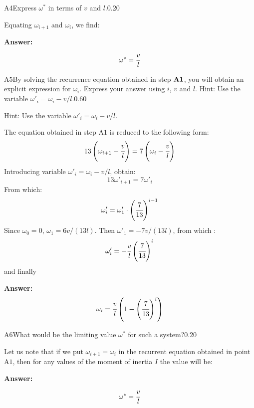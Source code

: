 \documentclass[11pt,a4paper]{article}
\begin{document}
\begin{solcard}{A4}{Express $\omega^*$ in terms of $v$ and $l$.}{0.20}

Equating $\omega_{i+1}$ and $\omega_i$, we find:

\par\smallskip\noindent\textbf{Answer:} $$\omega^*=\cfrac{v}{l} $$
\end{solcard}
\begin{solcard}{A5}{By solving the recurrence equation obtained in step $\bf A1$, you will obtain an explicit expression for $\omega_i$. Express your answer using $i$, $v$ and $l$. Hint: Use the variable $\omega'_i=\omega_i-v/l$.}{0.60}

Hint: Use the variable $\omega'_i=\omega_i-v/l$.


The equation obtained in step $\mathrm{A1}$ is reduced to the following form: $$13\left(\omega_{i+1}-\cfrac{v}{l}\right)=7\left(\omega_i-\cfrac{v}{l}\right) $$ Introducing variable $\omega'_i=\omega_i-v/l$, obtain: $$13\omega'_{i+1}=7\omega'_i $$ From which: $$\omega'_i=\omega'_1\cdot{\left(\cfrac{7}{13}\right)^{i-1}} $$ Since $\omega_0 =0$, $\omega_1=6v/(13l)$. Then $\omega'_1=-7v/(13l)$, from which : $$\omega'_i=-\cfrac{v}{l}\left(\cfrac{7}{13}\right)^i $$ and finally
\par\smallskip\noindent\textbf{Answer:} $$\omega_i=\cfrac{v}{l}\left(1-\left(\cfrac{7}{13}\right)^i\right) $$
\end{solcard}
\begin{solcard}{A6}{What would be the limiting value $\omega^*$ for such a system?}{0.20}

Let us note that if we put $\omega_{i+1}=\omega_i$ in the recurrent equation obtained in point $\mathrm{A1}$, then for any values of the moment of inertia $I$ the value will be:

\par\smallskip\noindent\textbf{Answer:} $$\omega^*=\cfrac{v}{l} $$
\end{solcard}
\end{document}
